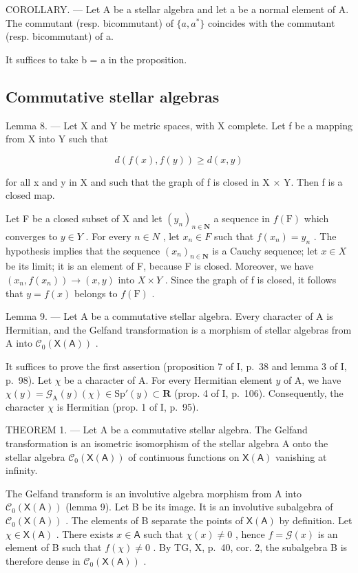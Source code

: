 COROLLARY. --- Let A be a stellar algebra and let a be a normal element of A. The commutant (resp. bicommutant) of \(\{a, a^{*}\}\) coincides with the commutant (resp. bicommutant) of a.

It suffices to take b = a in the proposition.

\subsection{Commutative stellar algebras}

Lemma 8. --- Let X and Y be metric spaces, with X complete. Let f be a mapping from X into Y such that

\[
d (f (x), f (y)) \geqslant d (x, y)
\]

for all x and y in X and such that the graph of f is closed in X × Y. Then f is a closed map.

Let F be a closed subset of X and let \((y_{n})_{n\in\mathbf{N}}\) a sequence in \(f(\mathrm{F})\) which converges to \(y\in Y\) . For every \(n\in N\) , let \(x_{n}\in F\) such that \(f(x_{n})=y_{n}\) . The hypothesis implies that the sequence \((x_{n})_{n\in\mathbf{N}}\) is a Cauchy sequence; let \(x\in X\) be its limit; it is an element of F, because F is closed. Moreover, we have \((x_{n},f(x_{n}))\to(x,y)\) into \(X\times Y\) . Since the graph of f is closed, it follows that \(y=f(x)\) belongs to \(f(\mathrm{F})\) .

Lemma 9. --- Let A be a commutative stellar algebra. Every character of A is Hermitian, and the Gelfand transformation is a morphism of stellar algebras from A into \(\mathcal{C}_{0}(\mathsf{X}(\mathsf{A}))\) .

It suffices to prove the first assertion (proposition 7 of I, p.~38 and lemma 3 of I, p.~98). Let \(\chi\) be a character of A. For every Hermitian element \(y\) of A, we have \(\chi(y) = \mathcal{G}_{\mathrm{A}}(y)(\chi) \in \mathrm{Sp}'(y) \subset \mathbf{R}\) (prop. 4 of I, p.~106). Consequently, the character \(\chi\) is Hermitian (prop. 1 of I, p.~95).

THEOREM 1. --- Let A be a commutative stellar algebra. The Gelfand transformation is an isometric isomorphism of the stellar algebra A onto the stellar algebra \(\mathcal{C}_{0}(\mathsf{X}(\mathsf{A}))\) of continuous functions on \(\mathsf{X}(\mathsf{A})\) vanishing at infinity.

The Gelfand transform is an involutive algebra morphism from A into \(\mathcal{C}_{0}(\mathsf{X}(\mathsf{A}))\) (lemma 9). Let B be its image. It is an involutive subalgebra of \(\mathcal{C}_{0}(\mathsf{X}(\mathsf{A}))\) . The elements of B separate the points of \(\mathsf{X}(\mathsf{A})\) by definition. Let \(\chi \in \mathsf{X}(\mathsf{A})\) . There exists \(x \in \mathsf{A}\) such that \(\chi(x) \neq 0\) , hence \(f = \mathcal{G}(x)\) is an element of B such that \(f(\chi) \neq 0\) . By TG, X, p.~40, cor. 2, the subalgebra B is therefore dense in \(\mathcal{C}_{0}(\mathsf{X}(\mathsf{A}))\) .

